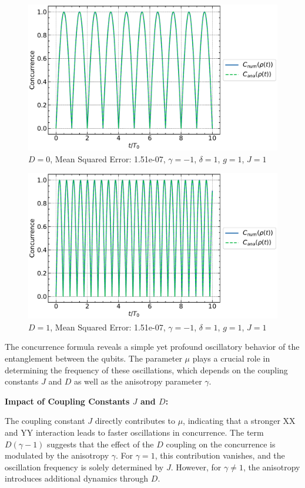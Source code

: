     \begin{figure}[h!]
        \centering
        \includegraphics[width=0.8\linewidth]{results_and_discussion/2_qubits/up_down_with_ana_0.pdf}
        \caption{\centering $D=0$, Mean Squared Error: 1.51e-07, $\gamma = -1$, $\delta = 1$, $g = 1$, $J = 1$}
        \label{fig:concurrencecpsiD_0}
    \end{figure}
    \begin{figure}[h!]
        \centering
        \includegraphics[width=0.8\linewidth]{results_and_discussion/2_qubits/up_down_with_ana_1.pdf}
        \caption{\centering $D=1$, Mean Squared Error: 1.51e-07, $\gamma = -1$, $\delta = 1$, $g = 1$, $J = 1$}
        \label{fig:concurrencecpsiD_1}
    \end{figure}

\newpage

The concurrence formula reveals a simple yet profound oscillatory behavior of the entanglement between the qubits. The parameter \(\mu\) plays a crucial role in determining the frequency of these oscillations, which depends on the coupling constants \(J\) and \(D\) as well as the anisotropy parameter \(\gamma\).

\textbf{Impact of Coupling Constants \(J\) and \(D\):}

The coupling constant \(J\) directly contributes to \(\mu\), indicating that a stronger XX and YY interaction 
        leads to faster oscillations in concurrence. The term \(D(\gamma-1)\) suggests 
        that the effect of the \(D\) coupling on the concurrence 
        is modulated by the anisotropy \(\gamma\). For \(\gamma = 1\), 
        this contribution vanishes, and the oscillation frequency is 
        solely determined by \(J\). However, for \(\gamma \neq 1\), 
        the anisotropy introduces additional dynamics through \(D\).


